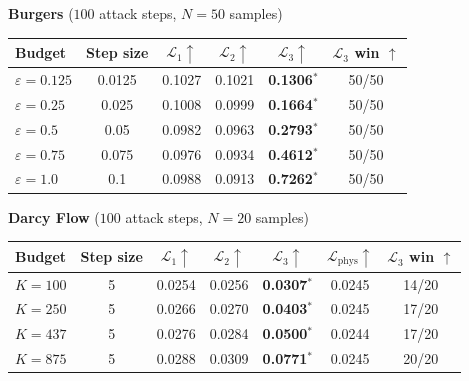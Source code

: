 ﻿\documentclass[letterpaper]{article} %
\begin{document}
\begin{table}[t]
\centering
\normalsize
\setlength{\tabcolsep}{1.1pt}
\textbf{Burgers} (\(100\) attack steps, \(N=50\) samples)\\[0.15em]
\begin{tabular}{@{}lccccc@{}}
\toprule
Budget & Step size & \(\mathcal L_1 \uparrow\) & \(\mathcal L_2 \uparrow\) &
\(\boldsymbol{\mathcal L}_3 \uparrow\) & \(\mathcal L_3\) win \(\uparrow\) \\
\midrule
\(\varepsilon=0.125\) & 0.0125 & 0.1027 & 0.1021 & \textbf{0.1306}\(^{*}\) & 50/50 \\
\(\varepsilon=0.25\) & 0.025 & 0.1008 & 0.0999 & \textbf{0.1664}\(^{*}\) & 50/50 \\
\(\varepsilon=0.5\) & 0.05 & 0.0982 & 0.0963 & \textbf{0.2793}\(^{*}\) & 50/50 \\
\(\varepsilon=0.75\) & 0.075 & 0.0976 & 0.0934 & \textbf{0.4612}\(^{*}\) & 50/50 \\
\(\varepsilon=1.0\) & 0.1 & 0.0988 & 0.0913 & \textbf{0.7262}\(^{*}\) & 50/50 \\
\bottomrule
\end{tabular}

\vspace{0.1em}
\setlength{\tabcolsep}{0.6pt}
\textbf{Darcy Flow} (\(100\) attack steps, \(N=20\) samples)\\[0.15em]
\begin{tabular}{@{}lcccccc@{}}
\toprule
Budget & Step size & \(\mathcal L_1 \uparrow\) & \(\mathcal L_2 \uparrow\) &
\(\boldsymbol{\mathcal L}_3 \uparrow\) & \(\mathcal L_{\mathrm{phys}} \uparrow\) &
\(\mathcal L_3\) win \(\uparrow\) \\
\midrule
$K=100$ & 5 & 0.0254 & 0.0256 & \textbf{0.0307}\(^{*}\) & 0.0245 & 14/20 \\
$K=250$ & 5 & 0.0266 & 0.0270 & \textbf{0.0403}\(^{*}\) & 0.0245 & 17/20 \\
$K=437$ & 5 & 0.0276 & 0.0284 & \textbf{0.0500}\(^{*}\) & 0.0244 & 17/20 \\
$K=875$ & 5 & 0.0288 & 0.0309 & \textbf{0.0771}\(^{*}\) & 0.0245 & 20/20 \\
\bottomrule
\end{tabular}


\end{table}
\end{document}

